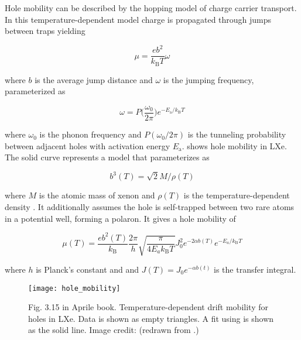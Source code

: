 Hole mobility can be described by the hopping model of charge carrier transport.  In this temperature-dependent model charge is
propagated through jumps between traps yielding

\begin{equation}
\mu = \frac{e b^2}{k_{\mathrm{B}} T} \omega
\label{eq:importance_procedure_effects_charge_mobility_simple}
\end{equation}

\noindent where $b$ is the average jump distance and $\omega$ is the jumping frequency, parameterized as

\begin{equation}
\omega = P \Big( \frac{\omega_0}{2 \pi} \Big) e^{-E_{\mathrm{a}} / k_{\mathrm{B}} T}
\end{equation}

\noindent where $\omega_0$ is the phonon frequency and $P(\omega_0 / 2 \pi)$ is the tunneling probability between adjacent holes with
activation energy $E_{\mathrm{a}}$.   shows hole mobility in
LXe.  The solid curve represents a model that parameterizes  as

\begin{equation}
b^3(T) = \sqrt{2} M / \rho (T)
\end{equation}

\noindent where $M$ is the atomic mass of xenon and $\rho (T)$ is the temperature-dependent density .  It
additionally assumes the hole is self-trapped between two rare atoms in a potential well, forming a polaron.  It gives a hole mobility of

\begin{equation}
\mu (T) = \frac{e b^2 (T)}{k_{\mathrm{B}}} \frac{2 \pi}{h} \sqrt{\frac{\pi}{4 E_a k_{\mathrm{B}} T}} J_0^2
e^{-2 \alpha b(T)} e^{-E_a / k_{\mathrm{B}} T}
\label{eq:importance_procedure_effects_charge_mobility_polaron}
\end{equation}

\noindent where $h$ is Planck's constant and and $J(T) = J_0 e^{-\alpha b(t)}$ is the transfer integral.

\begin{figure}
\centering
\texttt{[image: hole\_mobility]}
\caption{Fig. 3.15 in Aprile book.  Temperature-dependent drift mobility for holes in LXe.  Data is shown as empty triangles.  A fit
using  is shown as the solid line.  Image credit: 
(redrawn from .)}
\label{fig:importance_procedure_effects_charge_hole_mobility}
\end{figure}

